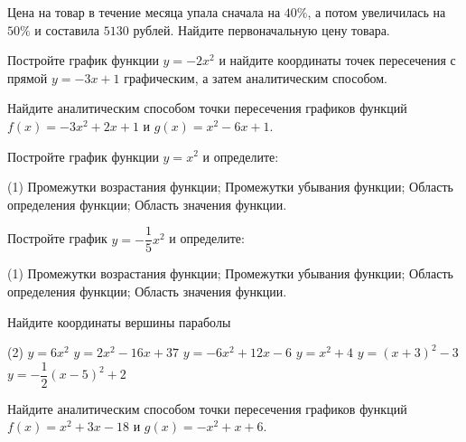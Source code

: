 \begin{class}[number=2]
	\begin{listofex}
		\item Цена на товар в течение месяца упала сначала на \( 40\% \), а потом увеличилась на \( 50\% \) и составила \( 5130  \) рублей. Найдите первоначальную цену товара.
		\item {}
		\item Постройте график функции \( y=-2x^2 \) и найдите координаты точек пересечения с прямой \( y=-3x+1 \) графическим, а затем аналитическим способом.
		\item Найдите аналитическим способом точки пересечения графиков функций \(f(x)=-3x^2+2x+1\)	и \( g(x)=x^2-6x+1 \).
		\item Постройте график функции \( y=x^2 \) и определите:
		\begin{tasks}(1)
			\task Промежутки возрастания функции;
			\task Промежутки убывания функции;
			\task Область определения функции;
			\task Область значения функции.
		\end{tasks}
		\item Постройте график \( y=-\dfrac{1}{5}x^2 \) и определите:
		\begin{tasks}(1)
			\task Промежутки возрастания функции;
			\task Промежутки убывания функции;
			\task Область определения функции;
			\task Область значения функции.
		\end{tasks}
		\item Найдите координаты вершины параболы 
		\begin{tasks}(2)
			\task \( y=6x^2 \)
			\task \( y=2x^2-16x+37 \)
			\task \( y=-6x^2+12x-6 \)
			\task \( y=x^2+4 \)
			\task \( y=(x+3)^2-3 \)
			\task \( y=-\dfrac{1}{2}(x-5)^2+2 \)
		\end{tasks}
		\item Найдите аналитическим способом точки пересечения графиков функций \(f(x)=x^2+3x-18\)	и \( g(x)=-x^2+x+6 \).
	\end{listofex}
\end{class}


